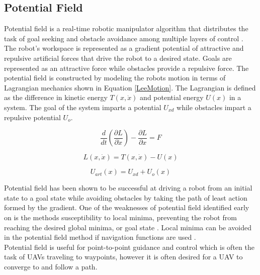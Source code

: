 \documentclass[numbered,pdftex]{ohio-etd}
\begin{document}
\subsection{Potential Field}
Potential field is a real-time robotic manipulator algorithm that distributes the task of goal seeking and obstacle avoidance among multiple layers of control \cite{khatib_real-time_1986}. The robot's workspace is represented as a gradient potential of attractive and repulsive artificial forces that drive the robot to a desired state. Goals are represented as an attractive force while obstacles provide a repulsive force. The potential field is constructed by modeling the robots motion in terms of Lagrangian mechanics shown in Equation \ref{LeeMotion}. The Lagrangian is defined as the difference in kinetic energy $T(x,\dot{x})$ and potential energy $U(x)$ in a system. The goal of the system imparts a potential $U_{xd}$ while obstacles impart a repulsive potential $U_o$. 

\begin{equation}\label{LeeMotion}
\frac{d}{dt} \left(\frac{\partial L}{\partial \dot{x}}\right) - \frac{\partial L}{\partial x} = F
\end{equation}

\begin{equation}\label{lagrange}
L(x,\dot{x}) = T(x,\dot{x}) - U(x)
\end{equation}

\begin{equation}\label{potential}
U_{art}(x) = U_{xd} + U_o(x)
\end{equation}

Potential field has been shown to be successful at driving a robot from an initial state to a goal state while avoiding obstacles by taking the path of least action formed by the gradient. One of the weaknesses of potential field identified early on is the methods susceptibility to local minima, preventing the robot from reaching the desired global minima, or goal state \cite{koren_potential_1991}. Local minima can be avoided in the potential field method if navigation functions are used \cite{goerzen_survey_2010}.\\

Potential field is useful for point-to-point guidance and control which is often the task of UAVs traveling to waypoints, however it is often desired for a UAV to converge to and follow a path. 

%
%
%
\end{document}
